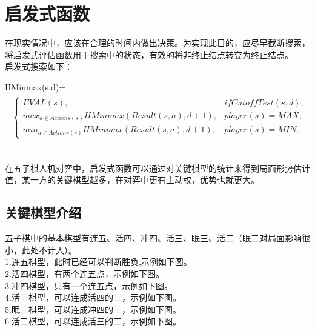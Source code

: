 \documentclass{acm_proc_article-sp}
\begin{document}
\section{\textbf{启发式函数}}
在现实情况中，应该在合理的时间内做出决策。为实现此目的，应尽早截断搜索，将启发式评估函数用于搜索中的状态，有效的将非终止结点转变为终止结点。\\
启发式搜索如下：\\
\begin{tiny}
HMinmax(s,d)=\\
\begin{equation}
\begin{split}
\begin{aligned}
\left\{
\begin{array}{lr} 
EVAL(s),& if CutoffTest(s,d), \\
max_{a\in Actions(s)}HMinmax(Result(s,a),d+1) , & player(s)=MAX,\\
min_{a\in Actions(s)}HMinmax(Result(s,a),d+1), & player(s)=MIN.
\end{array}
\right.
\end{aligned}
\end{split}
\end{equation}
\end{tiny}
\\
在五子棋人机对弈中，启发式函数可以通过对关键棋型的统计来得到局面形势估计值，某一方的关键棋型越多，在对弈中更有主动权，优势也就更大。\\
\subsection{\textbf{关键棋型介绍}}
五子棋中的基本棋型有连五、活四、冲四、活三、眠三、活二（眠二对局面影响很小，此处不计入）。\\
1.连五棋型，此时已经可以判断胜负,示例如下图。\\
2.活四棋型，有两个连五点，示例如下图。\\
3.冲四棋型，只有一个连五点，示例如下图。\\
4.活三棋型，可以连成活四的三，示例如下图。\\
5.眠三棋型，可以连成冲四的三，示例如下图。\\
6.活二棋型，可以连成活三的二，示例如下图。\\
\end{document}
